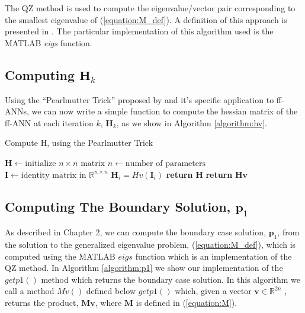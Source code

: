 \documentclass[letterpaper,12pt,titlepage,oneside,final]{book}
\begin{document}
	The QZ method is used to compute the eigenvalue/vector pair corresponding to the smallest eigenvalue of (\ref{equation:M_def}). A definition of this approach is presented in \cite{golub1989matrix}. The particular implementation of this algorithm used is the MATLAB \textit{eigs} function. 
	
	\subsection{Computing $\mathbf{H}_{k}$}
	
	Using the ``Pearlmutter Trick'' proposed by \cite{Pearlmutter.1993} and it's specific application to ff-ANNs, we can now write a simple function to compute the hessian matrix of the ff-ANN at each iteration $k$, $\mathbf{H}_{k}$, as we show in Algorithm \ref{algorithm:hv}.
	
	\makeatletter
	\def\BState{\State\hskip-\ALG@thistlm}
	\makeatother
	
	\begin{algorithm}
		\caption{Compute H, using the Pearlmutter Trick \cite{Pearlmutter.1993}}
		\begin{algorithmic}[1]
			\State $\mathbf{H} \gets \text{initialize } n \times n \text{ matrix}$
			\State $n \gets \text{number of parameters}$
			\State $\mathbf{I} \gets \text{identity matrix in }\mathbb{R}^{n\times n}$
			\State $\mathbf{H}_{i} = Hv(\mathbf{I}_{i})$
			\EndFor
			\State \textbf{return} $\mathbf{H}$
			\EndProcedure
			\State \textbf{return} $\mathbf{Hv}$
			\EndProcedure			
			\label{algorithm:hv}
		\end{algorithmic}
	\end{algorithm}

	\subsection{Computing The Boundary Solution, $\mathbf{p}_{1}$}
	
	As described in Chapter 2, we can compute the boundary case solution, $\mathbf{p}_{1}$, from the solution to the generalized eigenvalue problem, (\ref{equation:M_def}), which is computed using the MATLAB $eigs$ function which is an implementation of the QZ method. In Algorithm \ref{algorithm:p1} we show our implementation of the $getp1()$ method which returns the boundary case solution. In this algorithm we call a method $Mv()$ defined below $getp1()$ which, given a vector $\mathbf{v} \in \mathbb{R}^{2n}$ , returns the product, $\mathbf{Mv}$, where $\mathbf{M}$ is defined in (\ref{equation:M}). 
	
\end{document}

